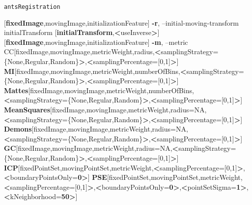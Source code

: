 \documentclass[ignorenonframetext,]{beamer}
\newenvironment{Shaded}{\begin{snugshade}}{\end{snugshade}}
\newcommand{\KeywordTok}[1]{\textcolor[rgb]{0.13,0.29,0.53}{\textbf{{#1}}}}
\newcommand{\DataTypeTok}[1]{\textcolor[rgb]{0.13,0.29,0.53}{{#1}}}
\newcommand{\NormalTok}[1]{{#1}}
\begin{document}
\begin{frame}[fragile]{\texttt{antsRegistration}}
\begin{Shaded}
\begin{Highlighting}[]
                                   \NormalTok{[}\KeywordTok{fixedImage}\NormalTok{,movingImage,initializationFeature]}
     \KeywordTok{-r}\NormalTok{, --initial-moving-transform initialTransform}
                                    \NormalTok{[}\KeywordTok{initialTransform}\NormalTok{,}\KeywordTok{<}\NormalTok{useInverse}\KeywordTok{>}\NormalTok{]}
                                    \NormalTok{[}\KeywordTok{fixedImage}\NormalTok{,movingImage,initializationFeature]}
     \KeywordTok{-m}\NormalTok{, --metric CC[fixedImage,movingImage,metricWeight,radius,}\KeywordTok{<}\NormalTok{samplingStrategy=}\DataTypeTok{\{None,Regular,Random\}}\KeywordTok{>}\NormalTok{,}\KeywordTok{<}\NormalTok{samplingPercentage=[0,1]}\KeywordTok{>}\NormalTok{]}
                  \KeywordTok{MI}\NormalTok{[fixedImage,movingImage,metricWeight,numberOfBins,}\KeywordTok{<}\NormalTok{samplingStrategy=}\DataTypeTok{\{None,Regular,Random\}}\KeywordTok{>}\NormalTok{,}\KeywordTok{<}\NormalTok{samplingPercentage=[0,1]}\KeywordTok{>}\NormalTok{]}
                  \KeywordTok{Mattes}\NormalTok{[fixedImage,movingImage,metricWeight,numberOfBins,}\KeywordTok{<}\NormalTok{samplingStrategy=}\DataTypeTok{\{None,Regular,Random\}}\KeywordTok{>}\NormalTok{,}\KeywordTok{<}\NormalTok{samplingPercentage=[0,1]}\KeywordTok{>}\NormalTok{]}
                  \KeywordTok{MeanSquares}\NormalTok{[fixedImage,movingImage,metricWeight,radius=NA,}\KeywordTok{<}\NormalTok{samplingStrategy=}\DataTypeTok{\{None,Regular,Random\}}\KeywordTok{>}\NormalTok{,}\KeywordTok{<}\NormalTok{samplingPercentage=[0,1]}\KeywordTok{>}\NormalTok{]}
                  \KeywordTok{Demons}\NormalTok{[fixedImage,movingImage,metricWeight,radius=NA,}\KeywordTok{<}\NormalTok{samplingStrategy=}\DataTypeTok{\{None,Regular,Random\}}\KeywordTok{>}\NormalTok{,}\KeywordTok{<}\NormalTok{samplingPercentage=[0,1]}\KeywordTok{>}\NormalTok{]}
                  \KeywordTok{GC}\NormalTok{[fixedImage,movingImage,metricWeight,radius=NA,}\KeywordTok{<}\NormalTok{samplingStrategy=}\DataTypeTok{\{None,Regular,Random\}}\KeywordTok{>}\NormalTok{,}\KeywordTok{<}\NormalTok{samplingPercentage=[0,1]}\KeywordTok{>}\NormalTok{]}
                  \KeywordTok{ICP}\NormalTok{[fixedPointSet,movingPointSet,metricWeight,}\KeywordTok{<}\NormalTok{samplingPercentage=[0,1]}\KeywordTok{>}\NormalTok{,}\KeywordTok{<}\NormalTok{boundaryPointsOnly=}\KeywordTok{0>}\NormalTok{]}
                  \KeywordTok{PSE}\NormalTok{[fixedPointSet,movingPointSet,metricWeight,}\KeywordTok{<}\NormalTok{samplingPercentage=[0,1]}\KeywordTok{>}\NormalTok{,}\KeywordTok{<}\NormalTok{boundaryPointsOnly=}\KeywordTok{0>}\NormalTok{,}\KeywordTok{<}\NormalTok{pointSetSigma=}\KeywordTok{1>}\NormalTok{,}\KeywordTok{<}\NormalTok{kNeighborhood=}\KeywordTok{50>}\NormalTok{]}

\end{Highlighting}
\end{Shaded}
\end{frame}
\end{document}
